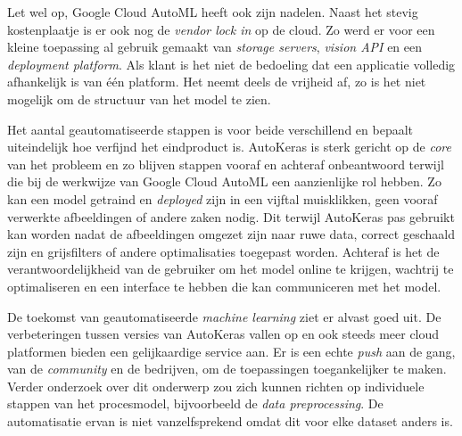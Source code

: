 Let wel op, Google Cloud AutoML heeft ook zijn nadelen. Naast het stevig kostenplaatje is er ook nog de \textit{vendor lock in} op de cloud. Zo werd er voor een kleine toepassing al gebruik gemaakt van \textit{storage servers}, \textit{vision API} en een \textit{deployment platform}. Als klant is het niet de bedoeling dat een applicatie volledig afhankelijk is van één platform. Het neemt deels de vrijheid af, zo is het niet mogelijk om de structuur van het model te zien. 

Het aantal geautomatiseerde stappen is voor beide verschillend en bepaalt uiteindelijk hoe verfijnd het eindproduct is. AutoKeras is sterk gericht op de \textit{core} van het probleem en zo blijven stappen vooraf en achteraf onbeantwoord terwijl die bij de werkwijze van Google Cloud AutoML een aanzienlijke rol hebben. Zo kan een model getraind en \textit{deployed} zijn in een vijftal muisklikken, geen vooraf verwerkte afbeeldingen of andere zaken nodig. Dit terwijl AutoKeras pas gebruikt kan worden nadat de afbeeldingen omgezet zijn naar ruwe data, correct geschaald zijn en grijsfilters of andere optimalisaties toegepast worden. Achteraf is het de verantwoordelijkheid van de gebruiker om het model online te krijgen, wachtrij te optimaliseren en een interface te hebben die kan communiceren met het model.

De toekomst van geautomatiseerde \textit{machine learning} ziet er alvast goed uit. De verbeteringen tussen versies van AutoKeras vallen op en ook steeds meer cloud platformen bieden een gelijkaardige service aan. Er is een echte \textit{push} aan de gang, van de \textit{community} en de bedrijven, om de toepassingen toegankelijker te maken. Verder onderzoek over dit onderwerp zou zich kunnen richten op individuele stappen van het procesmodel, bijvoorbeeld de \textit{data preprocessing}. De automatisatie ervan is niet vanzelfsprekend omdat dit voor elke dataset anders is.